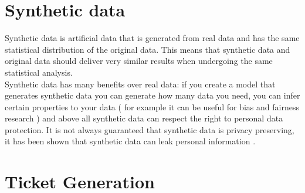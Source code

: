 \section{Synthetic data}
Synthetic data is artificial data that is generated from real data and has the same statistical distribution of the original data. This means that synthetic data and original data should deliver very similar results when undergoing the same statistical analysis. \\
Synthetic data has many benefits over real data: if you create a model that generates synthetic data you can generate how many data you need, you can infer certain properties to your data ( for example it can be useful for bias and fairness research ) and above all synthetic data can respect the right to personal data protection. It is not always guaranteed that synthetic data is privacy preserving, it has been shown that synthetic data can leak personal information \cite{bellovin2019privacy}.\\

\section{Ticket Generation}

